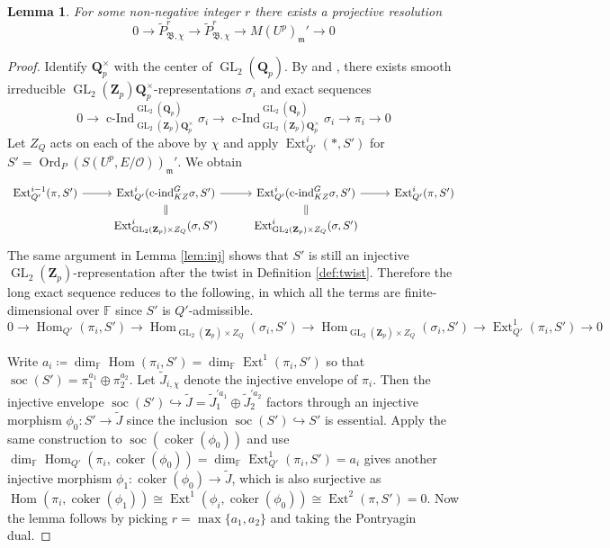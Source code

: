 \documentclass[leqno]{amsart}
\newtheorem{lem}[thm]{Lemma}
\theoremstyle{definition}
\theoremstyle{remark}
\newcommand{\oo}{\mathcal{O}}
\newcommand{\fF}{\mathbb{F}} %
\newcommand{\Qp}{\mathbf{Q}_p}
\newcommand{\Zp}{\mathbf{Z}_p}
\DeclareMathOperator{\Hom}{Hom}
\DeclareMathOperator{\Ext}{Ext}
\DeclareMathOperator{\cInd}{c-Ind}
\DeclareMathOperator{\coker}{coker}
\DeclareMathOperator{\GL}{GL}
\newcommand{\fm}{\mathfrak{m}}
\DeclareMathOperator{\Ord}{Ord} %
\DeclareMathOperator{\soc}{soc}
\newcommand{\B}{\mathfrak B} %
\begin{document}
\begin{lem}
	For some non-negative integer $r$
	there exists a projective resolution 
	\begin{equation}\label{eq:resolution}
	0\to \tilde{P}_{\B,\chi}^r\to 
	\tilde{P}_{\B,\chi}^r\to 
	M(U^p)_{\fm}'\to 0
	\end{equation}
\end{lem}
\begin{proof}
Identify $\Qp^\times$ with the center of $\GL_2(\Qp)$.
By \cite[Thm 33]{barthel} and \cite[Thm 19]{barthel}, 
there exists
smooth irreducible 
$\GL_2(\Zp)\Qp^\times$-representations $\sigma_i$
and exact sequences
\begin{equation}
	0\to 
	\cInd_{\GL_2(\Zp)\Qp^\times}^{\GL_2(\Qp)}\sigma_i\to
	\cInd_{\GL_2(\Zp)\Qp^\times}^{\GL_2(\Qp)}\sigma_i\to
	\pi_i\to 0
\end{equation}
Let $Z_Q$ acts on each 
of the above by $\chi$
and apply $\Ext^i_{Q'}(*,S')$
for $S'=\Ord_P(S(U^p,E/\oo))_{\fm}'$.
We obtain
\begin{equation*}
    \begin{tikzcd}[row sep=2ex]
	    \Ext^{i-1}_{Q'}
	    (\pi, S')\arrow[r] &
	    \Ext^{i}_{Q'}(\text{c-ind}_{KZ}^G\sigma, S')
	    \arrow[r] \arrow[d,equal] &
	    \Ext^{i}_{Q'}(\text{c-ind}_{KZ}^G\sigma, S')
	    \arrow[r] \arrow[d,equal] &
	    \Ext^{i}_{Q'}(\pi, S')\\ 
	 & \Ext^i_{\GL_2(\Zp)\times Z_Q}(\sigma ,S') &
	    \Ext^i_{\GL_2(\Zp)\times Z_Q}(\sigma ,S') &
    \end{tikzcd}
\end{equation*}
The same argument in Lemma \ref{lem:inj}
shows that $S'$ is still 
an injective $\GL_2(\Zp)$-representation
after the twist in Definition \ref{def:twist}.
Therefore the long exact sequence reduces to 
the following, in which 
all the terms 
are finite-dimensional over $\fF$
since $S'$ is $Q'$-admissible.
\begin{equation*}
	0 \to \Hom_{Q'}(\pi_i,S')\to 
	\Hom_{\GL_2(\Zp)\times Z_Q}(\sigma_i,S')\to 
	\Hom_{\GL_2(\Zp)\times Z_Q}(\sigma_i,S')\to 
	\Ext^1_{Q'}(\pi_i,S')\to 0
\end{equation*}



Write $a_i\coloneqq \dim_{\fF} \Hom(\pi_i,S')=
\dim_{\fF} \Ext^1(\pi_i,S')$
so that $\soc(S')=\pi_1^{a_1}\oplus \pi_2^{a_2}$.
Let $\tilde{J}_{i,\chi}$ denote 
the injective envelope of $\pi_i$.
Then the injective envelope 
$\soc(S')\hookrightarrow \tilde{J}=\tilde{J}_1^{'a_1}\oplus \tilde{J}_2^{'a_2}$
factors through an injective morphism 
$\phi_0\colon S'\to \tilde{J}$
since the inclusion $\soc(S')\hookrightarrow S'$
is essential.
Apply the same construction 
to $\soc(\coker(\phi_0))$
and use $\dim_{\fF}\Hom_{Q'}(\pi_i, \coker(\phi_0))=
\dim_{\fF}\Ext^1_{Q'}(\pi_i, S')=a_i$
gives another injective morphism
$\phi_1\colon \coker(\phi_0)\to \tilde{J}$,
which is also surjective as 
$\Hom(\pi_i,\coker(\phi_1))
\cong \Ext^1(\phi_i,\coker(\phi_0))
\cong \Ext^2(\pi, S')=0$.
Now the lemma follows by picking
$r=\max\{a_1,a_2\}$ and taking the Pontryagin dual.
\end{proof}
\end{document}
